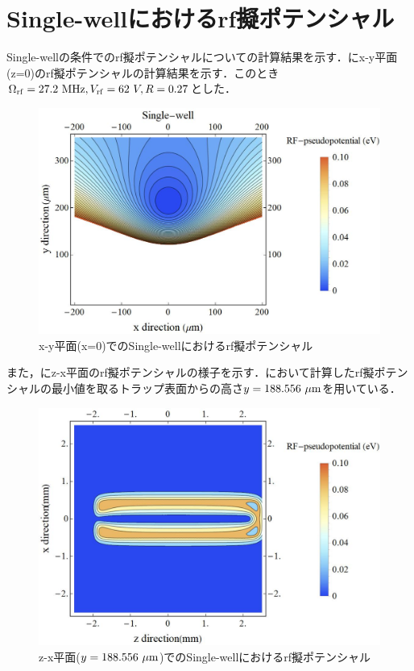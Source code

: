 \clearpage

\section{Single-wellにおけるrf擬ポテンシャル}
Single-wellの条件でのrf擬ポテンシャルについての計算結果を示す．にx-y平面(z=0)のrf擬ポテンシャルの計算結果を示す．このとき$\Omega_{\rm rf} = 27.2 \ {\rm MHz}, V_{\rm rf} = 62 \ V,R = 0.27$とした．
\begin{figure}[h]
	\begin{center}
	\includegraphics[width = 0.7\linewidth]{./simulation/figure/Single-well_Contour_xy@z=0.jpg}
	\caption{x-y平面(x=0)でのSingle-wellにおけるrf擬ポテンシャル}
	\label{fig:single-well_example_xy}
	\end{center}
\end{figure}
また，にz-x平面のrf擬ポテンシャルの様子を示す．において計算したrf擬ポテンシャルの最小値を取るトラップ表面からの高さ$y = 188.556 \ {\rm \mu m}$を用いている．
\begin{figure}[h]
	\begin{center}
	\includegraphics[width = 0.7\linewidth]{./simulation/figure/single-well_zx.jpg}
	\caption{z-x平面($y = 188.556 \ {\rm \mu m}$)でのSingle-wellにおけるrf擬ポテンシャル}
	\label{fig:single-well_example_zx}
	\end{center}
\end{figure}

